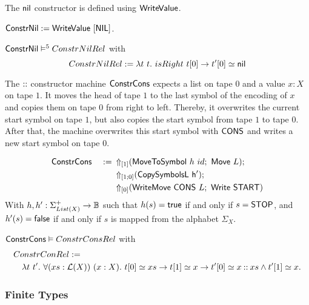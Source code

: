 The $\nil$ constructor is defined using $\MS{WriteValue}$.
\begin{definition}
  $\MS{ConstrNil} := \MS{WriteValue}~[\MS{NIL}]$.
\end{definition}
\begin{lemma}
  $\MS{ConstrNil} \RealiseIn{5} ConstrNilRel$ with
  \[
    ConstrNilRel := \lambda t~t.~isRight~t[0] \rightarrow t'[0] \simeq \nil
  \]
\end{lemma}

The $\cons$ constructor machine $\MS{ConstrCons}$ expects a list on tape $0$ and a value $x:X$ on tape $1$.  It moves the head of tape $1$ to the last
symbol of the encoding of $x$ and copies them on tape $0$ from right to left.  Thereby, it overwrites the current start symbol on tape $1$, but also
copies the start symbol from tape $1$ to tape $0$.  After that, the machine overwrites this start symbol with $\MS{CONS}$ and writes a new start
symbol on tape $0$.

\begin{definition}
  \label{def:Constr_cons}
  \begin{alignat*}{2}
    &\MS{ConstrCons}&~:=~& \LiftTapes{(\MS{MoveToSymbol}~h~id \Seq \MS{Move}~L)}{\Vector{1}} \Seq \\
    &               &    & \LiftTapes{(\MS{CopySymbolsL~h'})}{\Vector{1;0}} \Seq \\
    &               &    & \LiftTapes{(\MS{WriteMove}~\MS{CONS}~L \Seq \MS{Write}~\MS{START})}{\Vector{0}}
  \end{alignat*}
  With $h, h' : \Sigma_{List(X)}^+ \to \Bool$ such that $h(s)=\true$ if and only if $s=\MS{STOP}$, and $h'(s)=\false$ if and only if $s$ is mapped
  from the alphabet $\Sigma_X$.
\end{definition}

\begin{lemma}
  \label{lem:Constr_cons_Realise}
  $\MS{ConstrCons} \Realise ConstrConsRel$ with
  \begin{align*}
    & ConstrConRel := \\
    & \quad \lambda t~t'.~\forall (xs:\List(X))~(x:X).~t[0] \simeq xs \rightarrow t[1] \simeq x \rightarrow t'[0] \simeq x \cons xs \land t'[1] \simeq x.
  \end{align*}
\end{lemma}


\subsubsection{Finite Types}

